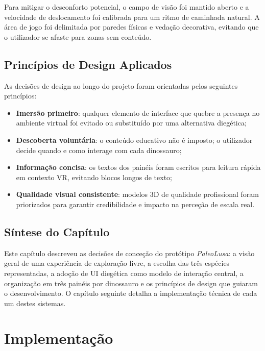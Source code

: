 \documentclass[a4paper,11pt]{report}
\newcommand{\blankpage}{%
    \newpage
    \thispagestyle{empty}
    \mbox{}
    \newpage
}
\begin{document}
Para mitigar o desconforto potencial, o campo de visão foi mantido aberto
e a velocidade de deslocamento foi calibrada para um ritmo de caminhada
natural. A área de jogo foi delimitada por paredes físicas e vedação
decorativa, evitando que o utilizador se afaste para zonas sem conteúdo.

\section{Princípios de Design Aplicados}

As decisões de design ao longo do projeto foram orientadas pelos seguintes
princípios:

\begin{itemize}
    \setlength\itemsep{0pt}
    \item \textbf{Imersão primeiro}: qualquer elemento de interface que
          quebre a presença no ambiente virtual foi evitado ou substituído
          por uma alternativa diegética;
    \item \textbf{Descoberta voluntária}: o conteúdo educativo não é
          imposto; o utilizador decide quando e como interage com cada
          dinossauro;
    \item \textbf{Informação concisa}: os textos dos painéis foram
          escritos para leitura rápida em contexto VR, evitando blocos
          longos de texto;
    \item \textbf{Qualidade visual consistente}: modelos 3D de qualidade
          profissional foram priorizados para garantir credibilidade e
          impacto na perceção de escala real.
\end{itemize}

\section{Síntese do Capítulo}

Este capítulo descreveu as decisões de conceção do protótipo \textit{PaleoLusa}:
a visão geral de uma experiência de exploração livre, a escolha das três espécies
representadas, a adoção de UI diegética como modelo de interação central,
a organização em três painéis por dinossauro e os princípios de design que
guiaram o desenvolvimento. O capítulo seguinte detalha a implementação técnica
de cada um destes sistemas.

\blankpage

\chapter{Implementação}
\end{document}
